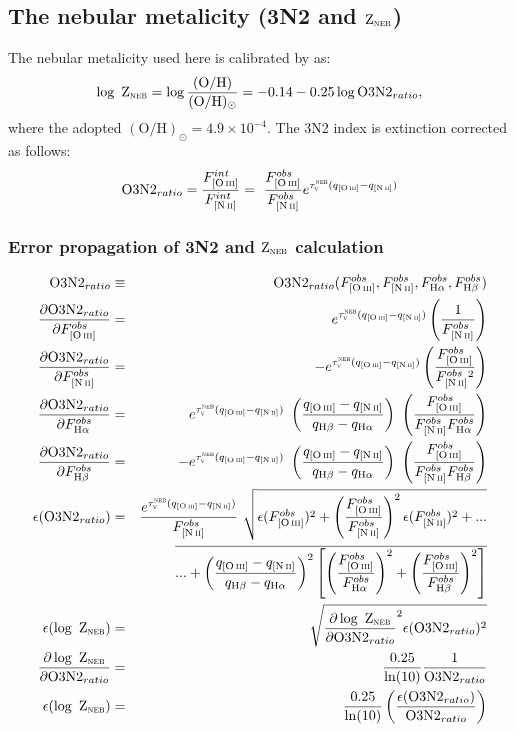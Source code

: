 \documentclass[a4paper,11pt]{article}
\begin{document}
\subsection{The nebular metalicity (\tO3N2 and $\textrm{Z}_{\textsc{neb}}$)}

The nebular metalicity used here is calibrated by \citep{Stasinska.2006a} as:
\begin{equation}
	\logZN = \log \frac{(\textrm{O}/\textrm{H})}{(\textrm{O}/\textrm{H})_\odot} = - 0.14 - 0.25 \log \O3N2,
\end{equation}
\noindent where the adopted $(\textrm{O}/\textrm{H})_\odot = 4.9 \times 10^{-4}$. The \tO3N2 index is extinction corrected as follows:
\begin{equation}
	\O3N2 = \frac{F_{\oIII}^{int}}{F_{\nII}^{int}} = \
\frac{F_{\oIII}^{obs}}{F_{\nII}^{obs}} e^{\tauVN (q_{\oIII} - q_{\nII})} \\
\end{equation}

\subsubsection{Error propagation of \tO3N2 and $\textrm{Z}_{\textsc{neb}}$ calculation}

\begin{eqnarray}
	\O3N2 &\equiv& \O3N2(F_{\oIII}^{obs}, F_{\nII}^{obs}, F_{\Halpha}^{obs}, F_{\Hbeta}^{obs}) \\
	\del{\O3N2}{F_{\oIII}^{obs}} &=& e^{\tauVN (q_{\oIII} - q_{\nII})}\left(\frac{1}{F_{\nII}^{obs}}\right) \\
	\del{\O3N2}{F_{\nII}^{obs}} &=& - e^{\tauVN (q_{\oIII} - q_{\nII})}\left(\frac{F_{\oIII}^{obs}}{F_{\nII}^{obs}{}^2}\right) \\
	\del{\O3N2}{F_{\Halpha}^{obs}} &=& e^{\tauVN (q_{\oIII} - q_{\nII})} \
\left(\frac{q_{\oIII} - q_{\nII}}{q_{\Hbeta} - q_{\Halpha}}\right) \
\left(\frac{F_{\oIII}^{obs}}{F_{\nII}^{obs} F_{\Halpha}^{obs}}\right) \\
	\del{\O3N2}{F_{\Hbeta}^{obs}} &=& - e^{\tauVN (q_{\oIII} - q_{\nII})} \
\left(\frac{q_{\oIII} - q_{\nII}}{q_{\Hbeta} - q_{\Halpha}}\right) \
\left(\frac{F_{\oIII}^{obs}}{F_{\nII}^{obs} F_{\Hbeta}^{obs}}\right) \\
	\nonumber \epsilon(\O3N2) &=& \frac{e^{\tauVN (q_{\oIII} - q_{\nII})}}{F_{\nII}^{obs}} \
\sqrt{ \epsilon(F_{\oIII}^{obs})^2 + \left(\frac{F_{\oIII}^{obs}}{F_{\nII}^{obs}}\right)^2 \epsilon(F_{\nII}^{obs})^2 + ... } \\
	&& \overline{... + \left(\frac{q_{\oIII} - q_{\nII}}{q_{\Hbeta} - q_{\Halpha}}\right)^2 \left[\left(\frac{F_{\oIII}^{obs}}{F_{\Halpha}^{obs}}\right)^2 + \left(\frac{F_{\oIII}^{obs}}{F_{\Hbeta}^{obs}}\right)^2 \right]} \\
	\epsilon(\logZN) &=& \sqrt{\del{\logZN}{\O3N2}^2 \epsilon(\O3N2)^2} \\
	\del{\logZN}{\O3N2} &=& \frac{0.25}{\ln(10)} \frac{1}{\O3N2} \\
	\epsilon(\logZN) &=& \frac{0.25}{\ln(10)} \left(\frac{\epsilon(\O3N2)}{\O3N2}\right)
\end{eqnarray}
\\
\end{document}
